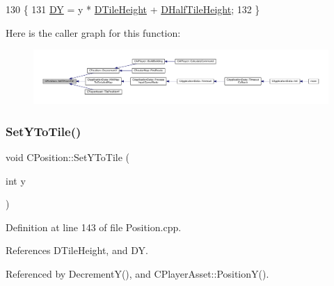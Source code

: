 \begin{DoxyCode}
130                                  \{
131     \hyperlink{classCPosition_a84139c9e8eb547e7cf3cb851739943a4}{DY} = y * \hyperlink{classCPosition_a202ebb83e86df75cfb76cf1241ba817c}{DTileHeight} + \hyperlink{classCPosition_a1e0af68f7690b3cfc14687cf7fbe7ade}{DHalfTileHeight};
132 \}
\end{DoxyCode}
Here is the caller graph for this function\+:\nopagebreak
\begin{figure}[H]
\begin{center}
\leavevmode
\includegraphics[width=350pt]{classCPosition_a4be1caa5ce58297e9d371f6bc1db32d9_icgraph}
\end{center}
\end{figure}
\hypertarget{classCPosition_a5805485f623398197ac595a5d389f691}{}\label{classCPosition_a5805485f623398197ac595a5d389f691} 
\subsubsection{\texorpdfstring{Set\+Y\+To\+Tile()}{SetYToTile()}}
{\footnotesize\ttfamily void C\+Position\+::\+Set\+Y\+To\+Tile (\begin{DoxyParamCaption}\item[{int}]{y }\end{DoxyParamCaption})}



Definition at line 143 of file Position.\+cpp.



References D\+Tile\+Height, and DY.



Referenced by Decrement\+Y(), and C\+Player\+Asset\+::\+Position\+Y().


